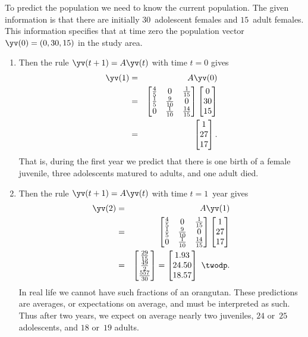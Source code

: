 \begin{example}[orangutans]
\begin{solution}
To predict the population we need to know the current population.
The given information is that there are initially \(30\)~adolescent females and \(15\)~adult females. 
This information specifies that at time zero the population vector \(\yv(0)=(0,30,15)\) in the study area.
\begin{enumerate}
\item Then the rule \(\yv(t+1)=A\yv(t)\) with time \(t=0\) gives
\begin{eqnarray*}
\yv(1)&=&A\yv(0)
\\&=&\begin{bmatrix} \frac45&0&\frac1{15}
\\\frac15&\frac9{10}&0
\\0&\frac1{10}&\frac{14}{15} \end{bmatrix}\begin{bmatrix} 0\\30\\15 \end{bmatrix}
\\&=&\begin{bmatrix} 1\\27\\17 \end{bmatrix}.
\end{eqnarray*}
That is, during the first year we predict that there is one birth of a female juvenile, three adolescents matured to adults, and one adult died. 

\item Then the rule \(\yv(t+1)=A\yv(t)\) with time \(t=1\)~year gives
\begin{eqnarray*}
\yv(2)&=&A\yv(1)
\\&=&\begin{bmatrix} \frac45&0&\frac1{15}
\\\frac15&\frac9{10}&0
\\0&\frac1{10}&\frac{14}{15} \end{bmatrix}\begin{bmatrix} 1\\27\\17 \end{bmatrix}
\\&=&\begin{bmatrix} \frac{29}{15}\\\frac{49}2\\\frac{557}{30} \end{bmatrix}=\begin{bmatrix} 1.93\\24.50\\18.57 \end{bmatrix}\ \twodp.
\end{eqnarray*}
In real life we cannot have such fractions of an orangutan.
These predictions are averages, or expectations on average, and must be interpreted as such. 
Thus after two years, we expect on average nearly two juveniles, \(24\) or~\(25\) adolescents, and \(18\) or~\(19\) adults.


\end{enumerate}
\end{solution}
\end{example}

